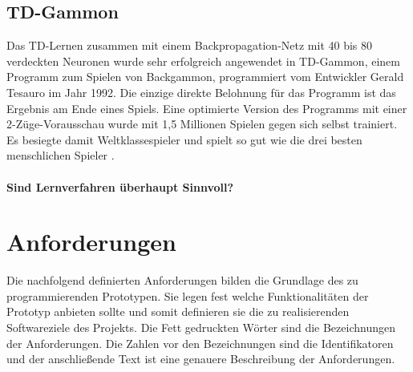 \subsection{TD-Gammon}
\label{subsec:TD-Gammon}
Das TD-Lernen zusammen mit einem Backpropagation-Netz mit 40 bis 80 verdeckten Neuronen wurde sehr erfolgreich angewendet in TD-Gammon, einem Programm zum Spielen von Backgammon, programmiert vom Entwickler Gerald Tesauro im Jahr 1992. Die einzige direkte Belohnung für das Programm ist das Ergebnis am Ende eines Spiels. Eine optimierte Version des Programms mit einer 2-Züge-Vorausschau wurde mit 1,5 Millionen Spielen gegen sich selbst trainiert. Es besiegte damit Weltklassespieler und spielt so gut wie die drei besten menschlichen Spieler \cite[304]{Ertel}.  

\paragraph{Sind Lernverfahren überhaupt Sinnvoll?}

\section{Anforderungen}
\label{sec:Anforderungen}
Die nachfolgend definierten Anforderungen bilden die Grundlage des zu programmierenden Prototypen. Sie legen fest welche Funktionalitäten der Prototyp anbieten sollte und somit definieren sie die zu realisierenden Softwareziele des Projekts. Die Fett gedruckten Wörter sind die Bezeichnungen der Anforderungen. Die Zahlen vor den Bezeichnungen sind die Identifikatoren und der anschließende Text ist eine genauere Beschreibung der Anforderungen. \\

